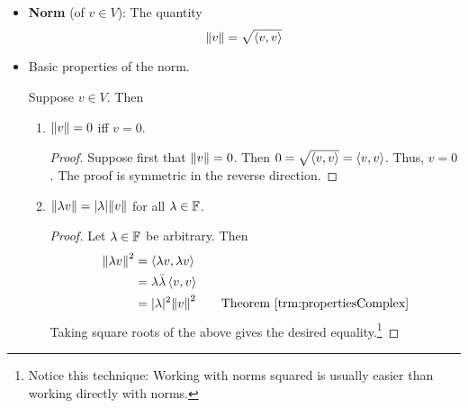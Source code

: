 \documentclass[../main.tex]{subfiles}
\begin{document}
\begin{itemize}
\begin{theorem}
\begin{enumerate}[label={\textup{(}\alph*\textup{)}},ref={\thetheorem\arabic*}]
\begin{proof}
\begin{align*}
                    \inp{u}{\lambda v} &= \overline{\inp{\lambda v}{u}}\\
                    &= \overline{\lambda\inp{v}{u}}\\
                    &= \bar{\lambda}\overline{\inp{v}{u}}\tag*{Theorem \ref{trm:propertiesComplex}}\\
                    &= \bar{\lambda}\inp{u}{v}
                \end{align*}
            \end{proof}
        \end{enumerate}
    \end{theorem}
    \item \textbf{Norm} (of $v\in V$): The quantity
    \begin{equation*}
        \norm{v} = \sqrt{\left\langle{v},{v}\right\rangle}
    \end{equation*}
    \item Basic properties of the norm.
    \begin{theorem}\label{trm:normProperties}
        Suppose $v\in V$. Then
        \begin{enumerate}[label={\textup{(}\alph*\textup{)}},ref={\thetheorem\alph*}]
            \item \label{trm:normPropertiesa}$\norm{v}=0$ iff $v=0$.
            \begin{proof}
                Suppose first that $\norm{v}=0$. Then $0=\sqrt{\left\langle{v},{v}\right\rangle}=\left\langle{v},{v}\right\rangle$. Thus, $v=0$. The proof is symmetric in the reverse direction.
            \end{proof}
            \item \label{trm:normPropertiesb}$\norm{\lambda v}=|\lambda|\norm{v}$ for all $\lambda\in\mathbb{F}$.
            \begin{proof}
                Let $\lambda\in\mathbb{F}$ be arbitrary. Then
                \begin{align*}
                    \norm{\lambda v}^2 &= \inp{\lambda v}{\lambda v}\\
                    &= \lambda\bar{\lambda}\inp{v}{v}\\
                    &= |\lambda|^2\norm{v}^2\tag*{Theorem \ref{trm:propertiesComplex}}
                \end{align*}
                Taking square roots of the above gives the desired equality.\footnote{Notice this technique: Working with norms squared is usually easier than working directly with norms.}
            \end{proof}
        \end{enumerate}

\end{theorem}
\end{itemize}
\end{document}

